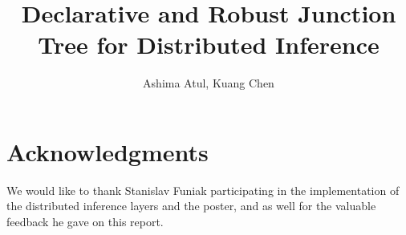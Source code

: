 \documentclass[11pt]{article}
\title{Declarative and Robust Junction Tree for Distributed Inference}
\author{Ashima Atul, Kuang Chen}
\begin{document}
\maketitle
\thispagestyle{fancy}




\section*{Acknowledgments}
We would like to thank Stanislav Funiak participating in the implementation of
the distributed inference layers and the poster, and as well for the valuable
feedback he gave on this report.




\appendix

\end{document}
